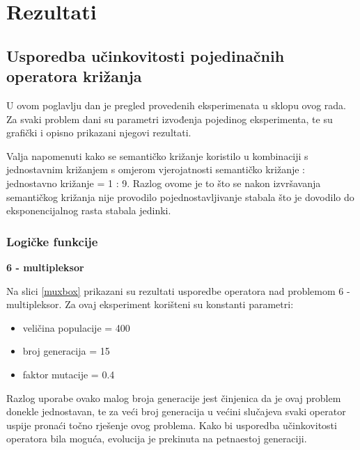 



\section{Rezultati}
\subsection{Usporedba učinkovitosti pojedinačnih operatora križanja}
U ovom poglavlju dan je pregled provedenih eksperimenata u sklopu ovog rada. Za svaki problem dani su parametri izvođenja pojedinog eksperimenta, te su grafički i opisno prikazani njegovi rezultati.

Valja napomenuti kako se semantičko križanje koristilo u kombinaciji s jednostavnim križanjem s omjerom vjerojatnosti semantičko križanje : jednostavno križanje = 1 : 9. Razlog ovome je to što se nakon izvršavanja semantičkog križanja nije provodilo pojednostavljivanje stabala što je dovodilo do eksponencijalnog rasta stabala jedinki.
\subsubsection{Logičke funkcije}
\textbf{6 - multipleksor}

Na slici \ref{muxbox} prikazani su rezultati usporedbe operatora nad problemom 6 - multipleksor. Za ovaj eksperiment korišteni su konstanti parametri:
\begin{itemize}
\item{veličina populacije = 400}
\item{broj generacija = 15}
\item{faktor mutacije = 0.4}
\end{itemize}


Razlog uporabe ovako malog broja generacije jest činjenica da je ovaj problem donekle jednostavan, te za veći broj generacija u većini slučajeva svaki operator uspije pronaći točno rješenje ovog problema. Kako bi usporedba učinkovitosti operatora bila moguća, evolucija je prekinuta na petnaestoj generaciji.

